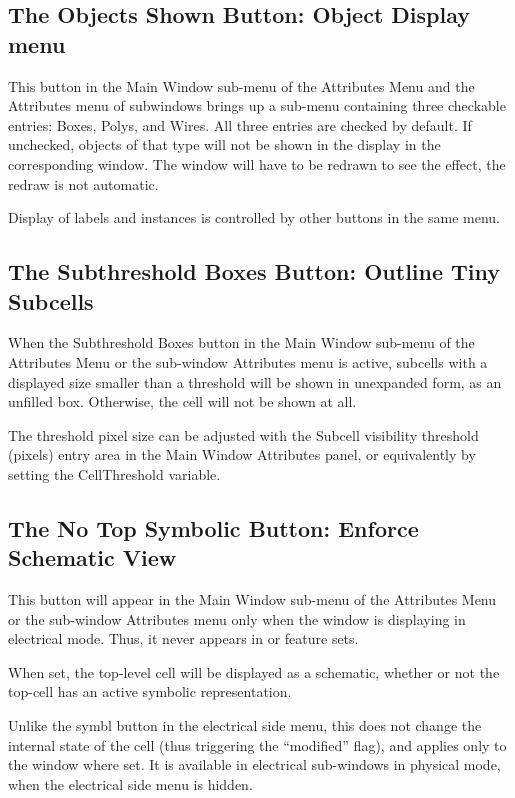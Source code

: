 \subsection{The {\cb Objects Shown} Button: Object Display menu}
This button in the {\cb Main Window} sub-menu of the {\cb Attributes
Menu} and the {\cb Attributes} menu of subwindows brings up a sub-menu
containing three checkable entries:  {\cb Boxes}, {\cb Polys}, and
{\cb Wires}.  All three entries are checked by default.  If unchecked,
objects of that type will not be shown in the display in the
corresponding window.  The window will have to be redrawn to see the
effect, the redraw is not automatic.
 
Display of labels and instances is controlled by other buttons in the
same menu.


\subsection{The {\cb Subthreshold Boxes} Button: Outline Tiny Subcells}
When the {\cb Subthreshold Boxes} button in the {\cb Main Window}
sub-menu of the {\cb Attributes Menu} or the sub-window {\cb
Attributes} menu is active, subcells with a displayed size smaller
than a threshold will be shown in unexpanded form, as an unfilled box. 
Otherwise, the cell will not be shown at all.

The threshold pixel size can be adjusted with the {\cb Subcell
visibility threshold (pixels)} entry area in the {\cb Main Window
Attributes} panel, or equivalently by setting the {\et CellThreshold}
variable.


\subsection{The {\cb No Top Symbolic} Button: Enforce Schematic View}
This button will appear in the {\cb Main Window} sub-menu of the {\cb
Attributes Menu} or the sub-window {\cb Attributes} menu only when the
window is displaying in electrical mode.  Thus, it never appears in
{\XicII} or {\Xiv} feature sets.

When set, the top-level cell will be displayed as a schematic, whether
or not the top-cell has an active symbolic representation.

Unlike the {\cb symbl} button in the electrical side menu, this does
not change the internal state of the cell (thus triggering the
``modified'' flag), and applies only to the window where set.  It is
available in electrical sub-windows in physical mode, when the
electrical side menu is hidden.

